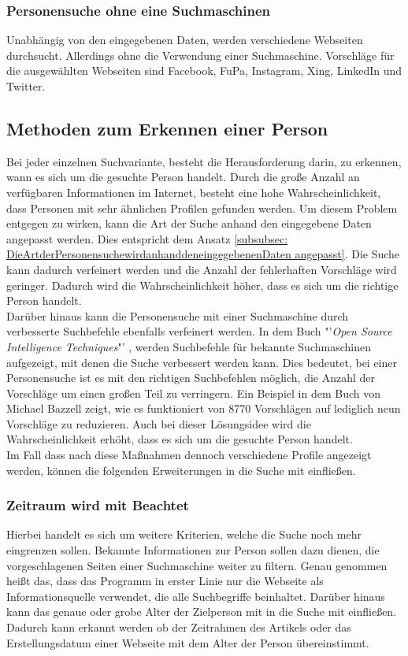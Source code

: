 		\subsubsection{Personensuche ohne eine Suchmaschinen}
		\label{subsubsec:PersonensucheohneSuchmaschine}
		Unabhängig von den eingegebenen Daten, werden verschiedene Webseiten durchsucht. Allerdings ohne die Verwendung einer Suchmaschine. Vorschläge für die ausgewählten Webseiten sind Facebook, FuPa, Instagram, Xing, LinkedIn und Twitter.

	
	\subsection{Methoden zum Erkennen einer Person}
	\label{sec:WannhandeltessichumdiegesuchtePerson}
	Bei jeder einzelnen Suchvariante, besteht die Herausforderung darin, zu erkennen, wann es sich um die gesuchte Person handelt. Durch die große Anzahl an verfügbaren Informationen im Internet, besteht eine hohe Wahrscheinlichkeit, dass Personen mit sehr ähnlichen Profilen gefunden werden. Um diesem Problem entgegen zu wirken, kann die Art der Suche anhand den eingegebene Daten angepasst werden. Dies entspricht dem Ansatz \ref{subsubsec: DieArtderPersonensuchewirdanhanddeneingegebenenDaten angepasst}. Die Suche kann dadurch verfeinert werden und die Anzahl der fehlerhaften Vorschläge wird geringer. Dadurch wird die Wahrscheinlichkeit höher, dass es sich um die richtige Person handelt.\\
	Darüber hinaus kann die Personensuche mit einer Suchmaschine durch verbesserte Suchbefehle ebenfalls verfeinert werden. In dem Buch "'\textit{Open Source Intelligence Techniques}"' \cite{Bazzell}, werden Suchbefehle für bekannte Suchmaschinen aufgezeigt, mit denen die Suche verbessert werden kann. Dies bedeutet, bei einer Personensuche ist es mit den richtigen Suchbefehlen möglich, die Anzahl der Vorschläge um einen großen Teil zu verringern. Ein Beispiel in dem Buch von Michael Bazzell zeigt, wie es funktioniert von 8770 Vorschlägen auf lediglich neun Vorschläge zu reduzieren.\cite{Bazzell} Auch bei dieser Lösungsidee wird die Wahrscheinlichkeit erhöht, dass es sich um die gesuchte Person handelt.\\ Im Fall dass nach diese Maßnahmen dennoch verschiedene Profile angezeigt werden, können die folgenden Erweiterungen in die Suche mit einfließen.
		\subsubsection{Zeitraum wird mit Beachtet}
		\label{sec:ErweiterteKriteriern}
		Hierbei handelt es sich um weitere Kriterien, welche die Suche noch mehr eingrenzen sollen. Bekannte Informationen zur Person sollen dazu dienen, die vorgeschlagenen Seiten einer Suchmaschine weiter zu filtern. Genau genommen heißt das, dass das Programm in erster Linie nur die Webseite als Informationsquelle verwendet, die alle Suchbegriffe beinhaltet. Darüber hinaus kann das genaue oder grobe Alter der Zielperson mit in die Suche mit einfließen. Dadurch kann erkannt werden ob der Zeitrahmen des Artikels oder das Erstellungsdatum einer Webseite mit dem Alter der Person übereinstimmt.
